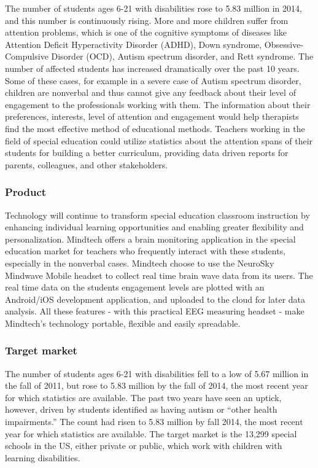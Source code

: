 \documentclass[letterpaper,10pt]{article}
\begin{document}
The number of students ages 6-21 with disabilities rose to 5.83 million in 2014, and this number is continuously rising. More and more children suffer from attention problems, which is one of the cognitive symptoms of diseases like Attention Deficit Hyperactivity Disorder (ADHD), Down syndrome, Obsessive-Compulsive Disorder (OCD), Autism spectrum disorder, and Rett syndrome. The number of affected students has increased dramatically over the past 10 years. Some of these cases, for example in a severe case of Autism spectrum disorder, children are nonverbal and thus cannot give any feedback about their level of engagement to the professionals working with them. The information about their preferences, interests, level of attention and engagement would help therapists find the most effective method of educational methods. Teachers working in the field of special education could utilize statistics about the attention spans of their students for building a better curriculum, providing data driven reports for parents, colleagues, and other stakeholders.

\subsubsection{Product}


Technology will continue to transform special education classroom instruction by enhancing individual learning opportunities and enabling greater flexibility and personalization. Mindtech offers a brain monitoring application in the special education market for teachers who frequently interact with these students, especially in the nonverbal cases.
Mindtech choose to use the NeuroSky Mindwave Mobile headset to collect real time brain wave data from its users. The real time data on the students engagement levels are plotted with an Android/iOS development application, and uploaded to the cloud for later data analysis. All these features - with this practical EEG measuring headset - make Mindtech's technology portable, flexible and easily spreadable.


\subsubsection{Target market}

The number of students ages 6-21 with disabilities fell to a low of 5.67 million in the fall of 2011, but rose to 5.83 million by the fall of 2014, the most recent year for which statistics are available. The past two years have seen an uptick, however, driven by students identified as having autism or “other health impairments.” The count had risen to 5.83 million by fall 2014, the most recent year for which statistics are available. 
The target market is the 13,299 special schools in the US, either private or public, which work with children with learning disabilities. 
\end{document}
